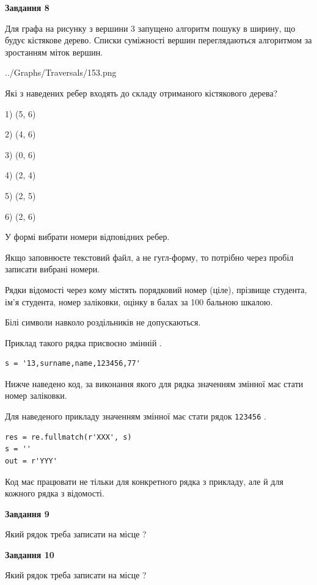 \documentclass[12pt, ukrainian]{article}
\def\code#1{\Verb!#1!}
\begin{document}
{\begin {large}
{\begin {center}\textbf{Завдання 8}\end {center}}\par
Для графа на рисунку з вершини 3 запущено алгоритм пошуку в ширину, що будує кістякове дерево. Списки суміжності вершин переглядаються алгоритмом за зростанням міток вершин.\par
\begin{center}
	{../Graphs/Traversals/153.png}
\end{center}
\par Які з наведених ребер входять до складу отриманого кістякового дерева?\par
1) (5, 6)\par
2) (4, 6)\par
3) (0, 6)\par
4) (2, 4)\par
5) (2, 5)\par
6) (2, 6)\par
{\vskip 15pt} У формі вибрати номери відповідних ребер.


Якщо заповнюєте текстовий файл, а не гугл-форму, то потрібно через пробіл записа\-ти вибрані номери.\par
\newpage


Рядки відомості через кому містять порядковий номер (ціле), пріз\-ви\-ще студен\-та, ім'я студента, номер заліковки, оцінку в балах за 100 бальною шкалою.

Білі символи навколо роздільників не допускаються.

Приклад такого рядка присвоєно змінній .



\begin{verbatim}
s = '13,surname,name,123456,77'
\end{verbatim}


Нижче наведено код, за виконання якого для рядка  значенням змінної  має стати номер заліковки.

Для наведеного прикладу значенням змінної  має стати рядок \code{123456} .



\begin{verbatim}
res = re.fullmatch(r'XXX', s)
s = ''
out = r'YYY'
\end{verbatim}


Код має працювати не тільки для конкретного рядка з прикладу, але й для кожного рядка з відомості.

{\begin {center}\textbf{Завдання 9}\end {center}}\par
Який рядок треба записати на місце  ?\par
\vspace{5mm}


{\begin {center}\textbf{Завдання 10}\end {center}}\par
Який рядок треба записати на місце  ?\par


\newpage


\end {large}}
\end{document}
